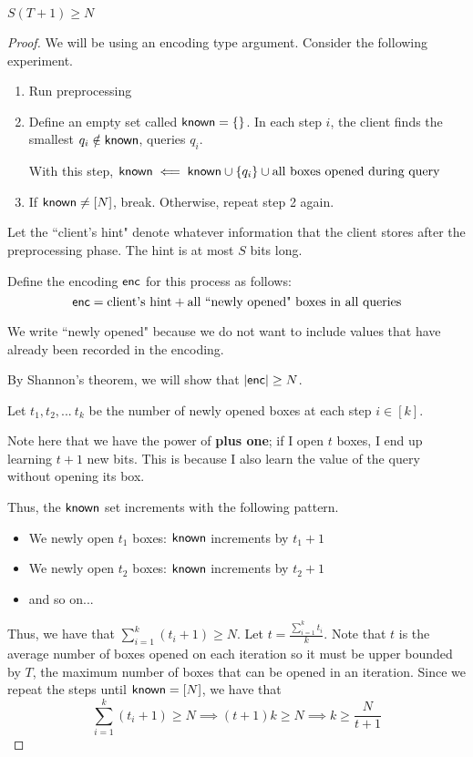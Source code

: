 \begin{theorem}
    $S(T+1) \ge N$ 
\end{theorem}
\begin{proof}
    We will be using an encoding type argument. Consider the following experiment.
    \begin{enumerate}
        \item Run preprocessing
        \item Define an empty set called ${\sf known} = \{\}$. In each step $i$, the client finds the smallest $q_i \notin {\sf known}$, queries $q_i$.

        With this step, ${\sf known} \impliedby {\sf known} \cup \{q_i\} \cup {\text{all boxes opened during query}}$
        \item If ${\sf known} \neq [N]$, break. Otherwise, repeat step 2 again.
    \end{enumerate}

    Let the ``client's hint" denote whatever information that the client stores after the preprocessing phase. The hint is at most $S$ bits long.
    
    Define the encoding ${\sf enc}$ for this process as follows: 
    \[{\sf enc} = \text{client's hint} + \text{all ``newly opened" boxes in all queries}\]

    We write ``newly opened" because we do not want to include values that have already been recorded in the encoding.
    \vspace{5mm}
    
    By Shannon's theorem, we will show that $|{\sf enc}| \ge N$.

    Let $t_1, t_2, ...\ t_k$ be the number of newly opened boxes at each step $i \in [k]$. 
    
    Note here that we have the power of \textbf{plus one}; if I open $t$ boxes, I end up learning $t+1$ new bits. This is because I also learn the value of the query without opening its box.

    Thus, the ${\sf known}$ set increments with the following pattern.

    \begin{itemize}
        \item We newly open $t_1$ boxes: ${\sf known}$ increments by $t_1 + 1$
        \item We newly open $t_2$ boxes: ${\sf known}$ increments by $t_2 + 1$
        \item and so on...
    \end{itemize}

    Thus, we have that $\sum_{i = 1}^k (t_i + 1)\ge N$. Let $t = \frac{\sum_{i = 1}^k t_i}{k}$. Note that $t$ is the average number of boxes opened on each iteration so it must be upper bounded by $T$, the maximum number of boxes that can be opened in an iteration. Since we repeat the steps until ${\sf known} = [N]$, we have that
    \[\sum_{i = 1}^k (t_i + 1)\ge N \implies (t+1)k \ge N \implies k\ge \frac{N}{t+1} \tag{1}\]


\end{proof}
